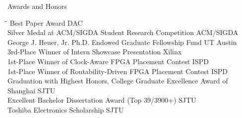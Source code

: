 
\begin{rSection}{Awards and Honors}
\begin{tabbing}
\hspace{5.50in}\= \hspace{1.00in}\= \kill
Best Paper Award \> DAC  \\
Silver Medal at ACM/SIGDA Student Research Competition \> ACM/SIGDA  \\
George J. Heuer, Jr. Ph.D. Endowed Graduate Fellowship Fund \> UT Austin  \\
3rd-Place Winner of Intern Showcase Presentation \> Xilinx  \\
1st-Place Winner of Clock-Aware FPGA Placement Contest \> ISPD  \\
1st-Place Winner of Routability-Driven FPGA Placement Contest \> ISPD  \\
Graduation with Highest Honors, College Graduate Excellence Award of Shanghai \> SJTU  \\
Excellent Bachelor Dissertation Award (Top 39/3900+) \> SJTU  \\
Toshiba Electronics Scholarship \> SJTU  \\

\end{tabbing}
\end{rSection}

